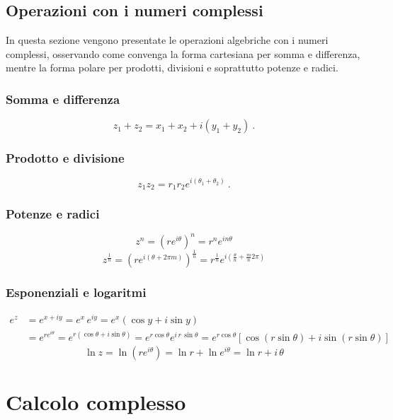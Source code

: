 \section{Operazioni con i numeri complessi}
In questa sezione vengono presentate le operazioni algebriche con i numeri complessi, osservando come convenga la forma cartesiana per somma e differenza, mentre la forma polare per prodotti, divisioni e soprattutto potenze e radici.

\subsection{Somma e differenza}
\begin{equation}
   z_1 + z_2 = x_1 + x_2 + i (y_1 + y_2) \ .
\end{equation}

\subsection{Prodotto e divisione}
\begin{equation}
   z_1 z_2 = r_1 r_2 e^{i(\theta_1+\theta_2)} \ .
\end{equation}

\subsection{Potenze e radici}
\begin{equation}
  z^n = \left( r e^{i\theta} \right)^n = r^n e^{i n\theta}
\end{equation}
\begin{equation}
  z^{\frac{1}{n}} = \left( r e^{i(\theta + 2\pi m)} \right)^{\frac{1}{n}} = r^{\frac{1}{n}} e^{i\left(\frac{\theta}{n} + \frac{m}{n} 2 \pi \right)}
\end{equation}

\subsection{Esponenziali e logaritmi}
\begin{equation}
\begin{aligned}
    e^z
    & = e^{x+i y} = e^x \, e^{i y} = e^x \left( \cos y + i \sin y \right) \\
    & = e^{r e^{i\theta}} = e^{r \left( \cos \theta + i \sin \theta \right)} = e^{r \cos \theta} e^{i \, r \, \sin \theta} = e^{r \cos \theta} \left[ \cos(r \sin \theta) + i \sin (r \sin \theta) \right]
\end{aligned}
\end{equation}
%
\begin{equation}
    \ln z = \ln \left( r e^{i \theta} \right) = \ln r + \ln e^{i \theta} = \ln r + i \, \theta
\end{equation}

\chapter{Calcolo complesso}\label{ch:complex-calculus}
